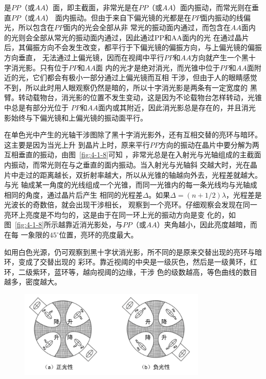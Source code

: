 \documentclass[11pt,a4paper]{article}
\begin{document}
\begin{spacing}{1.3}
\begin{CJK*}{UTF8}{gbsn}
是$PP$（或$AA$）面，即主截面，非常光是在$PP$（或$AA$）面内振动，而常光则在垂直$PP$（或$AA$）
面内振动。但由于来自下偏光镜的光都是在$PP$面内振动的线偏光，所以包含在$PP$面内的光会全部从非
常光的振动面内通过，而包含在$AA$面内的光则会全部从常光的振动面内通过，因此通过PP和AA面内的光
在通过晶片后，其偏振方向不会发生改变，都平行于下偏光镜的偏振方向，与上偏光镜的偏振方向垂直，
无法通过上偏光镜，因而在视阈中平行$PP$和$AA$方向就产生一个黑十字消光影。只有位于$PP$和$AA$面
内的光才是绝对消光，而光锥中位于$PP$和$AA$面附近的光，它们都会有极小一部分通过上偏光镜而互相
干涉，但由于人的眼睛感觉不到，所以此时用人眼观察仍然是暗的，所以十字消光影是两条有一定宽度的
黑臂。转动载物台，消光影的位置不发生变动，这是因为不论载物台怎样转动，光锥中总是有部分光位于
$PP$和$AA$面内或其附近，因此消光影总是存在的，并且消光影始终与下偏光镜和上偏光镜的振动面平行。
\par
在单色光中产生的光轴干涉图除了黑十字消光影外，还有互相交替的亮环与暗环。这主要是因为当光上升
到晶片上时，原来平行$PP$方向的振动在晶片中要分解为两互相垂直的振动，由图~\ref{fig:4-1-8}可知
，非常光总是在入射光与光轴组成的主截面内振动，而常光则在与之垂直的面内振动。当入射光与光轴斜
交越大时，光在晶片中走过的距离越长，双折射率越大，所以从光锥的轴越向外去，光程差就越大。与光
轴成某一角度的光线组成一个光锥，而同一光锥内的每一条光线均与光轴成相同的角度，通过晶片后产生
相同的光程差$\Delta$。如果$\Delta=(n+1/2)\lambda$，光程差是光波长的奇数倍，就会出现干涉相长，
观察到一个亮环。仔细观察会发现在同一亮环上亮度是不均匀的，这是由于在同一环上光的振动方向是变
化的，如图~\ref{fig:4-1-8}所示越靠近消光影处，与$PP$（或$AA$）夹角越小，因此亮度越暗，而在每
一象限的$45^{\circ}$位置，亮环的亮度最大。\par
如用白色光源，仍可观察到黑十字状消光影，所不同的是原来交替出现的亮环与暗环，变成了交替出现的
彩环。靠近视阈的中央是一级灰色，然后是一级黄环，红环，二级紫环，蓝环等，越向视阈的边缘，干涉
色的级数越高，等色曲线的数目越多，密度越大。\par
\begin{figure}
\centering
\includegraphics[width=0.8\textwidth]{fig4-1-9}

\end{figure}
\end{CJK*}
\end{spacing}
\end{document}

